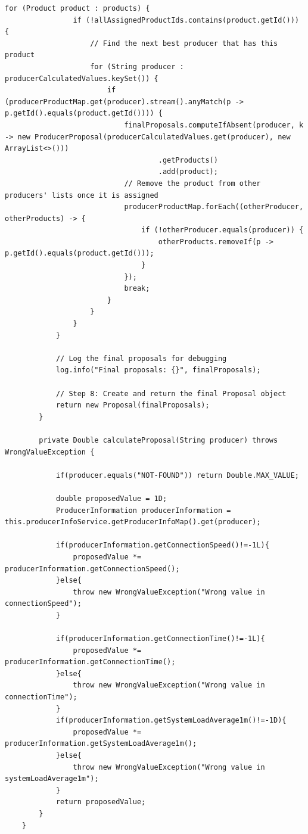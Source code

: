 \begin{lstlisting}[caption=Kod klasy ProposalService, label=ProposalServiceCode]
            for (Product product : products) {
                if (!allAssignedProductIds.contains(product.getId())) {
                    // Find the next best producer that has this product
                    for (String producer : producerCalculatedValues.keySet()) {
                        if (producerProductMap.get(producer).stream().anyMatch(p -> p.getId().equals(product.getId()))) {
                            finalProposals.computeIfAbsent(producer, k -> new ProducerProposal(producerCalculatedValues.get(producer), new ArrayList<>()))
                                    .getProducts()
                                    .add(product);
                            // Remove the product from other producers' lists once it is assigned
                            producerProductMap.forEach((otherProducer, otherProducts) -> {
                                if (!otherProducer.equals(producer)) {
                                    otherProducts.removeIf(p -> p.getId().equals(product.getId()));
                                }
                            });
                            break;
                        }
                    }
                }
            }
    
            // Log the final proposals for debugging
            log.info("Final proposals: {}", finalProposals);
    
            // Step 8: Create and return the final Proposal object
            return new Proposal(finalProposals);
        }
    
        private Double calculateProposal(String producer) throws WrongValueException {
    
            if(producer.equals("NOT-FOUND")) return Double.MAX_VALUE;
    
            double proposedValue = 1D;
            ProducerInformation producerInformation = this.producerInfoService.getProducerInfoMap().get(producer);
    
            if(producerInformation.getConnectionSpeed()!=-1L){
                proposedValue *= producerInformation.getConnectionSpeed();
            }else{
                throw new WrongValueException("Wrong value in connectionSpeed");
            }
            
            if(producerInformation.getConnectionTime()!=-1L){
                proposedValue *= producerInformation.getConnectionTime();
            }else{
                throw new WrongValueException("Wrong value in connectionTime");
            }
            if(producerInformation.getSystemLoadAverage1m()!=-1D){
                proposedValue *= producerInformation.getSystemLoadAverage1m();
            }else{
                throw new WrongValueException("Wrong value in systemLoadAverage1m");
            }
            return proposedValue;
        }
    }
    
\end{lstlisting}


